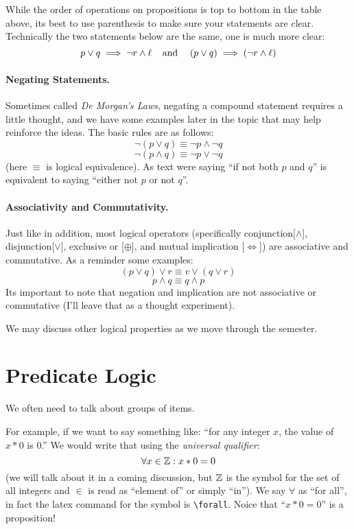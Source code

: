 \documentclass[11pt, oneside]{article}   	%
\begin{document}
While the order of operations on propositions is top to bottom in the table above, 
its best to use parenthesis to make sure your statements are clear. 
Technically the two statements below are the same, one is much more clear:
\[
p \vee q \implies \neg r \wedge \ell \;\;\;\; \textnormal{and}\;\;\;\; \left(p\vee q\right) \implies \left(\neg r \wedge \ell\right) 
\]

\paragraph{Negating Statements.}
Sometimes called \emph{De Morgan's Laws}, negating a compound statement requires a little thought, 
and we have some examples later in the topic that may help reinforce the ideas. 
The basic rules are as follows:
\[ \neg\left(p \vee q\right) \equiv \neg p \wedge \neg q\]
\[ \neg\left(p \wedge q\right) \equiv \neg p \vee \neg q\]
(here $\equiv$ is logical equivalence).
As text were saying ``if not both $p$ and $q$'' is equivalent to saying ``either not $p$ or not $q$''.

\paragraph{Associativity and Commutativity.}
Just like in addition, most logical operators (specifically conjunction[$\wedge$], disjunction[$\vee$], exclusive or [$\oplus$], and mutual implication [$\iff$]) are associative and commutative.
As a reminder some examples:
\begin{equation}
\left(p \vee q\right) \vee r \equiv v \vee \left(q \vee r\right) \tag{associativity}
\end{equation}
\begin{equation}
p \wedge q \equiv q \wedge p \tag{commutativity}
\end{equation}
Its important to note that negation and implication are not associative or commutative (I'll leave that as a thought experiment).

We may discuss other logical properties as we move through the semester.  


\section{Predicate Logic}
We often need to talk about groups of items.

For example, if we want to say something like:
``for any integer $x$, the value of $x * 0$ is $0$.''
We would write that using the \emph{universal qualifier}:
\[\forall x\in\operatorname{\mathbb{Z}} : x*0 = 0\]
(we will talk about it in a coming discussion, but $\operatorname{\mathbb{Z}}$ is the symbol for the set of all integers and $\in$ is read as ``element of'' or simply ``in'').
We say $\forall$ as ``for all'', in fact the latex command for the symbol is \texttt{\textbackslash{}forall}.
Noice that ``$x*0 = 0$'' is a proposition!
\end{document}

